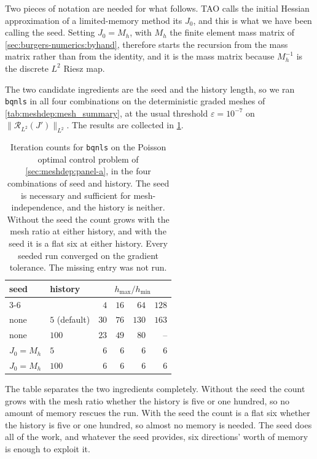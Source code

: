 \documentclass[a4paper,11pt]{article}
\newcommand{\Rmap}{\mathcal{R}}              %
\theoremstyle{spacedplain} \newtheorem{theorem}[counter]{Theorem} \newtheorem{lemma}[counter]{Lemma} \newtheorem{prop}[counter]{Proposition} \newtheorem{cor}[counter]{Corollary}
\theoremstyle{spaceddefinition} \newtheorem{defn}[counter]{Definition} \newtheorem{example}[counter]{Example} \newtheorem{remark}[counter]{Remark}
\begin{document}
Two pieces of notation are needed for what follows. TAO calls the initial Hessian approximation of a limited-memory method its $J_{0}$, and this is what we have been calling the seed. Setting $J_{0} = M_h$, with $M_h$ the finite element mass matrix of \cref{sec:burgers-numerics:byhand}, therefore starts the recursion from the mass matrix rather than from the identity, and it is the mass matrix because $M_h^{-1}$ is the discrete $L^{2}$ Riesz map.

The two candidate ingredients are the seed and the history length, so we ran \texttt{bqnls} in all four combinations on the deterministic graded meshes of \cref{tab:meshdep:mesh_summary}, at the usual threshold $\varepsilon = 10^{-7}$ on $\|\Rmap_{L^{2}}(J')\|_{L^{2}}$. The results are collected in \cref{tab:meshdep:bqnls-isolation}.

\begin{table}[H]
  \centering
  \begin{tabular}{l l r r r r}
    \toprule
    seed & history & \multicolumn{4}{c}{$h_{\max}/h_{\min}$} \\
    \cmidrule(lr){3-6}
     & & $4$ & $16$ & $64$ & $128$ \\
    \midrule
    none          & $5$ (default) & $30$ & $76$ & $130$ & $163$ \\
    none          & $100$         & $23$ & $49$ &  $80$ & {--} \\
    $J_0 = M_h$   & $5$           &  $6$ &  $6$ &   $6$ & $6$ \\
    $J_0 = M_h$   & $100$         &  $6$ &  $6$ &   $6$ & $6$ \\
    \bottomrule
  \end{tabular}
  \caption{Iteration counts for \texttt{bqnls} on the Poisson optimal control problem of \cref{sec:meshdep:panel-a}, in the four combinations of seed and history. The seed is necessary and sufficient for mesh-independence, and the history is neither. Without the seed the count grows with the mesh ratio at either history, and with the seed it is a flat six at either history. Every seeded run converged on the gradient tolerance. The missing entry was not run.}
  \label{tab:meshdep:bqnls-isolation}
\end{table}

The table separates the two ingredients completely. Without the seed the count grows with the mesh ratio whether the history is five or one hundred, so no amount of memory rescues the run. With the seed the count is a flat six whether the history is five or one hundred, so almost no memory is needed. The seed does all of the work, and whatever the seed provides, six directions' worth of memory is enough to exploit it. 
\end{document}

